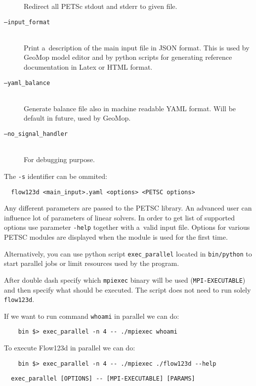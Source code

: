 \begin{description}
        Redirect all PETSc stdout and stderr to given file.
 \item[{\tt --input\_format}] \hfill\\
        Print a~description of the main input file in JSON format.
        This is used by GeoMop model editor and by python scripts for
        generating reference documentation in Latex or HTML format.
 \item[{\tt --yaml\_balance}] \hfill\\
        Generate balance file also in machine readable YAML format. Will be default in future, used by GeoMop.
 \item[{\tt --no\_signal\_handler}] \hfill\\
        For debugging purpose.
\end{description}

The {\tt -s} identifier can be ommited:
\begin{verbatim}
  flow123d <main_input>.yaml <options> <PETSC options>
\end{verbatim}

Any different parameters are passed to the PETSC library. An advanced user can influence lot of parameters of linear solvers. In order to get list of supported options
use parameter \verb'-help' together with a~valid input file. Options for various PETSC modules are displayed when the module is used for the first time.

Alternatively, you can use python script \verb'exec_parallel' located in \verb'bin/python' to start parallel jobs or limit resources used by the program.

After double dash specify which \verb'mpiexec' binary will be used (\verb'MPI-EXECUTABLE') and then specify what should be executed.
The script does not need to run solely \verb'flow123d'.

If we want to run command \verb'whoami' in parallel we can do:
\begin{verbatim}
	bin $> exec_parallel -n 4 -- ./mpiexec whoami
\end{verbatim}

To execute Flow123d in parallel we can do:
\begin{verbatim}
	bin $> exec_parallel -n 4 -- ./mpiexec ./flow123d --help
\end{verbatim}


\begin{verbatim}
  exec_parallel [OPTIONS] -- [MPI-EXECUTABLE] [PARAMS]
\end{verbatim}

